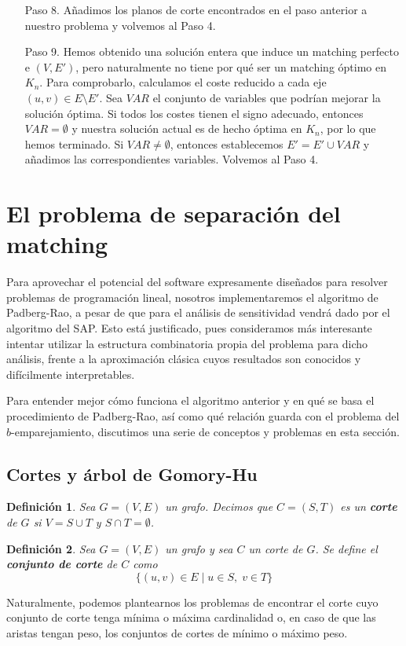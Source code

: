\documentclass[twoside,a4paper,openright,12pt,tikz]{book}
\newtheorem{defi}{Definici\'on}[section]
\begin{document}
\begin{itemize}
\item[Paso 8.] Añadimos los planos de corte encontrados en el paso anterior a nuestro problema y volvemos al Paso 4.
\item[Paso 9.] Hemos obtenido una solución entera que induce un matching perfecto e $(V,E')$, pero naturalmente no tiene por qué ser un matching óptimo en $K_n$. Para comprobarlo, calculamos el coste reducido a cada eje $(u,v)\in E\setminus E'$. Sea $VAR$ el conjunto de variables que podrían mejorar la solución óptima. Si todos los costes tienen el signo adecuado, entonces $VAR=\emptyset$ y nuestra solución actual es de hecho óptima en $K_n$, por lo que hemos terminado. Si $VAR\neq \emptyset$, entonces establecemos $E'=E'\cup VAR$ y añadimos las correspondientes variables. Volvemos al Paso 4.
\end{itemize}
\section{El problema de separación del matching}
Para aprovechar el potencial del software expresamente diseñados para resolver problemas de programación lineal, nosotros implementaremos el algoritmo de Padberg-Rao, a pesar de que para el análisis de sensitividad vendrá dado por el algoritmo del SAP. Esto está justificado, pues consideramos más interesante intentar utilizar la estructura combinatoria propia del problema para dicho análisis, frente a la aproximación clásica cuyos resultados son conocidos y difícilmente interpretables.

Para entender mejor cómo funciona el algoritmo anterior y en qué se basa el procedimiento de Padberg-Rao, así como qué relación guarda con el problema del $b$-emparejamiento, discutimos una serie de conceptos y problemas en esta sección.

\subsection{Cortes y árbol de Gomory-Hu} 
\begin{defi}
Sea $G = (V,E)$ un grafo. Decimos que $C=(S,T)$ es un \textbf{corte} de $G$ si $V = S \cup T$ y $S\cap T = \emptyset$.
\end{defi}
\begin{defi}
Sea $G=(V,E)$ un grafo y sea $C$ un corte de $G$. Se define el \textbf{conjunto de corte} de $C$ como
$$
\{(u,v)\in E \mid u \in S,\; v\in T\}
$$ 
\end{defi}
Naturalmente, podemos plantearnos los problemas de encontrar el corte cuyo conjunto de corte tenga mínima o máxima cardinalidad o, en caso de que las aristas tengan peso, los conjuntos de cortes de mínimo o máximo peso. 
\end{document}
